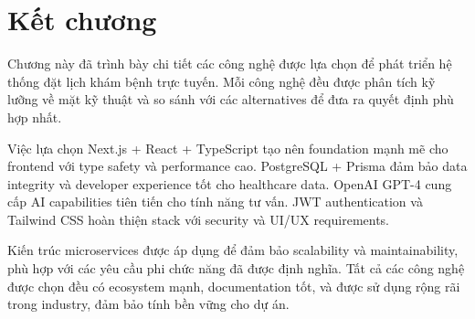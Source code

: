 \documentclass[../DoAn.tex]{subfiles}
\begin{document}
\section*{Kết chương}

Chương này đã trình bày chi tiết các công nghệ được lựa chọn để phát triển hệ thống đặt lịch khám bệnh trực tuyến. Mỗi công nghệ đều được phân tích kỹ lưỡng về mặt kỹ thuật và so sánh với các alternatives để đưa ra quyết định phù hợp nhất.

Việc lựa chọn Next.js + React + TypeScript tạo nên foundation mạnh mẽ cho frontend với type safety và performance cao. PostgreSQL + Prisma đảm bảo data integrity và developer experience tốt cho healthcare data. OpenAI GPT-4 cung cấp AI capabilities tiên tiến cho tính năng tư vấn. JWT authentication và Tailwind CSS hoàn thiện stack với security và UI/UX requirements.

Kiến trúc microservices được áp dụng để đảm bảo scalability và maintainability, phù hợp với các yêu cầu phi chức năng đã được định nghĩa. Tất cả các công nghệ được chọn đều có ecosystem mạnh, documentation tốt, và được sử dụng rộng rãi trong industry, đảm bảo tính bền vững cho dự án.
\end{document}
